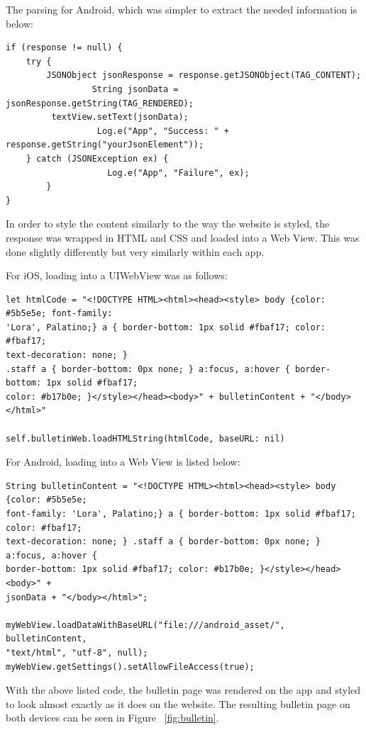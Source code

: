\documentclass[letterpaper,10pt,draftclsnofoot,onecolumn,titlepage]{IEEEtran}
\begin{document}
		The parsing for Android, which was simpler to extract the needed information is below: 
		
		\begin{lstlisting}
if (response != null) {
	try {
		JSONObject jsonResponse = response.getJSONObject(TAG_CONTENT);
                 String jsonData = jsonResponse.getString(TAG_RENDERED);
		 textView.setText(jsonData);                   
                  Log.e("App", "Success: " + response.getString("yourJsonElement"));
	} catch (JSONException ex) {
                    Log.e("App", "Failure", ex);
        }
}
	\end{lstlisting}
	

		In order to style the content similarly to the way the website is styled, the response was wrapped in HTML and CSS and loaded into a Web View.
		This was done slightly differently but very similarly within each app. 

		For iOS, loading into a UIWebView was as follows: 
		\begin{lstlisting}
let htmlCode = "<!DOCTYPE HTML><html><head><style> body {color: #5b5e5e; font-family: 
'Lora', Palatino;} a { border-bottom: 1px solid #fbaf17; color: #fbaf17; 
text-decoration: none; } 
.staff a { border-bottom: 0px none; } a:focus, a:hover { border-bottom: 1px solid #fbaf17; 
color: #b17b0e; }</style></head><body>" + bulletinContent + "</body></html>"
                
self.bulletinWeb.loadHTMLString(htmlCode, baseURL: nil)
		\end{lstlisting}
		
		For Android, loading into a Web View is listed below: 
		\begin{lstlisting}
String bulletinContent = "<!DOCTYPE HTML><html><head><style> body {color: #5b5e5e; 
font-family: 'Lora', Palatino;} a { border-bottom: 1px solid #fbaf17; color: #fbaf17; 
text-decoration: none; } .staff a { border-bottom: 0px none; } a:focus, a:hover { 
border-bottom: 1px solid #fbaf17; color: #b17b0e; }</style></head><body>" + 
jsonData + "</body></html>";

myWebView.loadDataWithBaseURL("file:///android_asset/", bulletinContent, 
"text/html", "utf-8", null);
myWebView.getSettings().setAllowFileAccess(true);
		\end{lstlisting}
		
		With the above listed code, the bulletin page was rendered on the app and styled to look almost exactly as it does on the website. 
		The resulting bulletin page on both devices can be seen in Figure ~\ref{fig:bulletin}.
		
\end{document}
